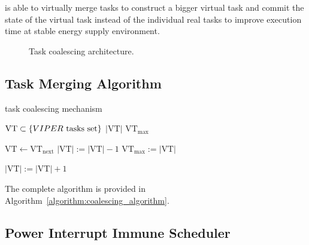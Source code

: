 \sys is able to virtually merge tasks to construct a bigger virtual task and commit the state of the virtual task instead of the individual real tasks to improve execution time at stable energy supply environment. 

\begin{figure}
	\centering
	\caption{Task coalescing architecture.}
	\label{fig:}
\end{figure}

\subsection{Task Merging Algorithm}

\begin{algorithm}[t]
	\caption{\sys task coalescing mechanism}
	\label{algorithm:coalescing_algorithm}
	\scriptsize
	\begin{algorithmic}[1]
		\State $\text{VT} \subset \{VIPER~\text{tasks set}\}$  
		\State $|\text{VT}|$ 
		\State $\text{VT}_{\max}$ 
		\vspace{0.1cm}
		
		\State $\text{VT} \leftarrow \text{VT}_{\text{next}}$ 
		\vspace{0.1cm}
		 				
		\State $|\text{VT}|:=|\text{VT}|-1$
		\State $\text{VT}_{\max} := |\text{VT}|$ 
		\EndIf
		\EndWhile
		
		\vspace{0.1cm}
		 
		 
		\State $|\text{VT}|:=|\text{VT}|+1$
		\EndIf
		\EndIf
		\EndWhile
	\end{algorithmic}
\end{algorithm}

The complete algorithm is provided in Algorithm~\ref{algorithm:coalescing_algorithm}. 

\subsection{Power Interrupt Immune Scheduler}

